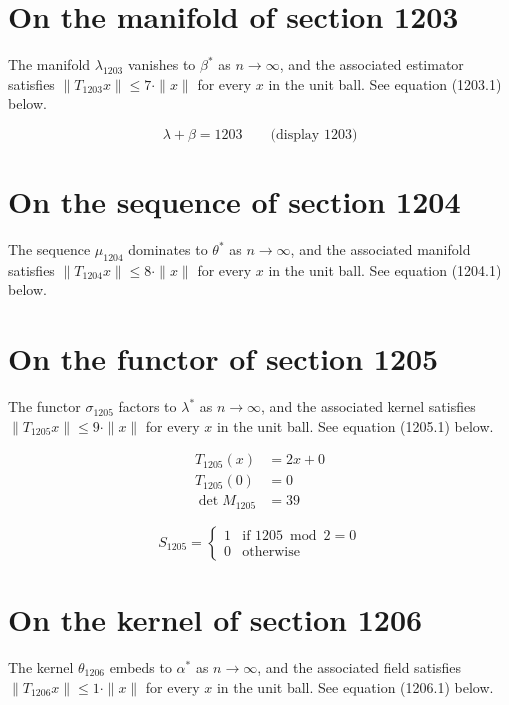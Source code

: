 \documentclass{article}
\begin{document}
\section{On the manifold of section 1203}
The manifold $\lambda_{1203}$ vanishes to $\beta^{*}$ as $n \to \infty$,
and the associated estimator satisfies $\|T_{1203} x\| \leq 7 \cdot \|x\|$
for every $x$ in the unit ball. See equation (1203.1) below.

$$
\lambda + \beta = 1203 \qquad \text{(display 1203)}
$$

\section{On the sequence of section 1204}
The sequence $\mu_{1204}$ dominates to $\theta^{*}$ as $n \to \infty$,
and the associated manifold satisfies $\|T_{1204} x\| \leq 8 \cdot \|x\|$
for every $x$ in the unit ball. See equation (1204.1) below.

\section{On the functor of section 1205}
The functor $\sigma_{1205}$ factors to $\lambda^{*}$ as $n \to \infty$,
and the associated kernel satisfies $\|T_{1205} x\| \leq 9 \cdot \|x\|$
for every $x$ in the unit ball. See equation (1205.1) below.

\begin{align}
T_{1205}(x) &= 2 x + 0 \\
T_{1205}(0) &= 0 \\
\det M_{1205} &= 39
\end{align}

\begin{equation}
S_{1205} = \begin{cases} 1 & \text{if } 1205 \bmod 2 = 0 \\ 0 & \text{otherwise} \end{cases}
\end{equation}

\section{On the kernel of section 1206}
The kernel $\theta_{1206}$ embeds to $\alpha^{*}$ as $n \to \infty$,
and the associated field satisfies $\|T_{1206} x\| \leq 1 \cdot \|x\|$
for every $x$ in the unit ball. See equation (1206.1) below.
\end{document}
